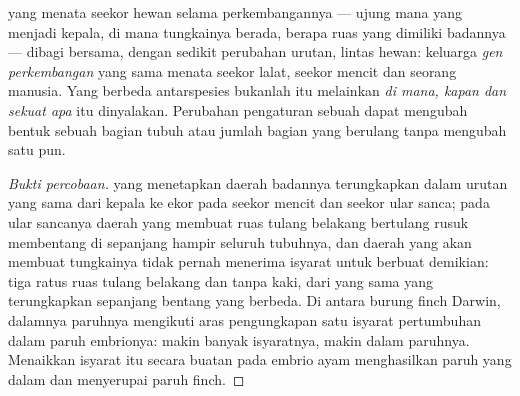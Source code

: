 \begin{proposition}\label{prop:g12:diversification-of-life:development}
 yang menata  seekor hewan selama perkembangannya ---
ujung mana yang menjadi kepala, di mana tungkainya berada, berapa ruas
yang dimiliki badannya --- dibagi bersama, dengan sedikit perubahan
urutan, lintas hewan: keluarga \emph{gen perkembangan}
yang sama menata seekor lalat, seekor mencit dan seorang
manusia. Yang berbeda antarspesies bukanlah  itu melainkan
\emph{di mana, kapan dan sekuat apa}  itu dinyalakan. Perubahan
pengaturan sebuah  dapat mengubah bentuk sebuah bagian
tubuh atau jumlah bagian yang berulang tanpa mengubah satu  pun.
\end{proposition}
\begin{proof}[Bukti percobaan]
 yang menetapkan daerah badannya terungkapkan dalam urutan yang sama
dari kepala ke ekor pada seekor mencit dan seekor ular sanca; pada ular
sancanya daerah yang membuat ruas tulang belakang bertulang rusuk
membentang di sepanjang hampir seluruh tubuhnya, dan daerah yang akan
membuat tungkainya tidak pernah menerima isyarat untuk berbuat demikian:
tiga ratus ruas tulang belakang dan tanpa kaki, dari  yang sama yang
terungkapkan sepanjang bentang yang berbeda. Di antara burung finch
Darwin, dalamnya paruhnya mengikuti aras pengungkapan satu isyarat
pertumbuhan dalam paruh embrionya: makin banyak isyaratnya, makin dalam
paruhnya. Menaikkan isyarat itu secara buatan pada embrio ayam
menghasilkan paruh yang dalam dan menyerupai paruh finch.
\end{proof}


